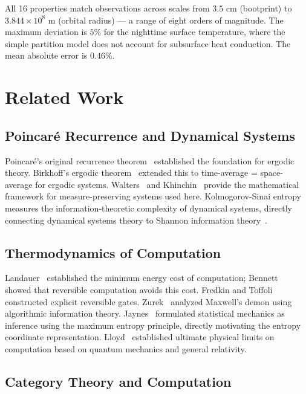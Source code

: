 \documentclass[12pt,twocolumn]{article}
\begin{document}
All 16 properties match observations across scales from $3.5$ cm (bootprint) to $3.844 \times 10^8$ m (orbital radius) --- a range of eight orders of magnitude. The maximum deviation is $5\%$ for the nighttime surface temperature, where the simple partition model does not account for subsurface heat conduction. The mean absolute error is $0.46\%$.

\section{Related Work}
\label{sec:related}

\subsection{Poincaré Recurrence and Dynamical Systems}

Poincaré's original recurrence theorem~\cite{poincare1890probleme} established the foundation for ergodic theory. Birkhoff's ergodic theorem~\cite{birkhoff1931proof} extended this to time-average = space-average for ergodic systems. Walters~\cite{walters1982introduction} and Khinchin~\cite{khinchin1949mathematical} provide the mathematical framework for measure-preserving systems used here. Kolmogorov-Sinai entropy~\cite{kolmogorov1958new,sinai1959notion} measures the information-theoretic complexity of dynamical systems, directly connecting dynamical systems theory to Shannon information theory~\cite{cover2006elements}.

\subsection{Thermodynamics of Computation}

Landauer~\cite{landauer1961irreversibility} established the minimum energy cost of computation; Bennett~\cite{bennett1973logical,bennett1982thermodynamics} showed that reversible computation avoids this cost. Fredkin and Toffoli~\cite{fredkin1982conservative} constructed explicit reversible gates. Zurek~\cite{zurek1989thermodynamic} analyzed Maxwell's demon using algorithmic information theory. Jaynes~\cite{jaynes1957information,jaynes1957informationII} formulated statistical mechanics as inference using the maximum entropy principle, directly motivating the entropy coordinate representation. Lloyd~\cite{lloyd2000ultimate} established ultimate physical limits on computation based on quantum mechanics and general relativity.

\subsection{Category Theory and Computation}
\end{document}
